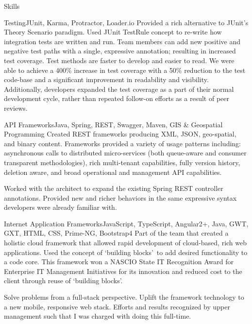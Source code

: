 \documentclass[]{mcdowellcv}
\begin{document}
\begin{cvsection}{Skills}
	\begin{cvsubsection2}{Testing}{JUnit, Karma, Protractor, Loader.io}
		 Provided a rich alternative to JUnit's Theory Scenario paradigm.   Used JUnit TestRule concept to re-write how integration tests are written and run.  
		  Team members can add new positive and negative test paths with a single, expressive annotation; resulting in increased test coverage.  Test methods are faster to develop and easier to read.  We were able to achieve a 400\% increase in test coverage with a 50\% reduction to the test code-base and a significant improvement in readability and visibility.  Additionally,  developers expanded the test coverage as a part of their normal development cycle, rather than repeated follow-on efforts as a result of peer reviews.
	\end{cvsubsection2}
	
	\begin{cvsubsection2}{API Frameworks}{Java, Spring, REST, Swagger, Maven, GIS \& Geospatial Programming}
		 Created REST frameworks producing XML, JSON, geo-spatial, and binary content.
		  Frameworks provided a variety of usage patterns including: asynchronous calls to distributed micro-services (both queue-aware and consumer transparent methodologies), rich multi-tenant capabilities, fully version history, deletion aware, and broad operational and management API capabilities.
		
		  Worked with the architect to expand the existing Spring REST controller annotations.
		 Provided new and richer behaviors in the same expressive syntax developers were already familiar with.
	\end{cvsubsection2}

	\begin{cvsubsection2}{Internet Application Frameworks}{JavaScript, TypeScript, Angular2+, Java, GWT, GXT, HTML, CSS, Prime-NG, Bootstrap4}
		 Part of the team that created a holistic cloud framework that allowed rapid development of cloud-based, rich web applications.  Used the concept of \lq building blocks\rq\ to add desired functionality to a code core.
		 This framework won a NASCIO State IT Recognition Award for Enterprise IT Management Initiatives for its innovation and reduced cost to the client through reuse of \lq building blocks\rq.
		
		 Solve problems from a full-stack perspective.  Uplift the framework technology to a new mobile, responsive web stack.
		  Efforts and results recognized by upper management such that I was charged with doing this full-time.
	\end{cvsubsection2}


\end{cvsection}
\end{document}
